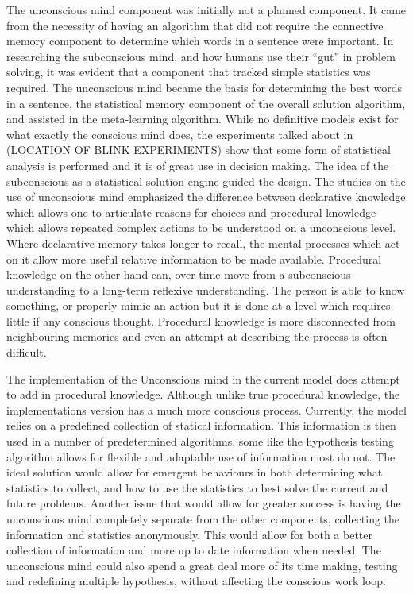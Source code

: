 The unconscious mind component was initially not a planned component.  It came from the necessity of having an algorithm that did not require
the connective memory component to determine which words in a sentence were important. In researching the subconscious mind, and how humans use their ``gut'' in problem solving, it was evident that a component that tracked simple statistics was required. The unconscious mind became the basis for determining the best words in a sentence, the statistical memory component of the overall solution algorithm, and assisted in the meta-learning algorithm.  While no definitive models exist for what exactly the  conscious mind does, the experiments talked about in (LOCATION OF BLINK EXPERIMENTS) show that some form of statistical analysis is performed and it is of great use in decision making.  The idea of the subconscious as a statistical solution engine guided the design.  The studies on the use of unconscious mind emphasized the difference between declarative knowledge which allows one to articulate reasons for choices and procedural knowledge which allows repeated complex actions to be understood on a unconscious level.  Where declarative memory takes longer to recall, the mental processes which act on it allow more useful relative information to be made available.  Procedural knowledge on the other hand can, over time move from a subconscious understanding to a long-term reflexive understanding.  The person is able to know something, or properly mimic an action but it is done at a level which requires little if any conscious thought.  Procedural knowledge is more disconnected from neighbouring memories and even an attempt at describing the process is often difficult. 

The implementation of the Unconscious mind in the current model does attempt to add in procedural knowledge.  Although unlike true procedural knowledge, the implementations version has a much more conscious process.  Currently, the model relies on a predefined collection of statical information.  This information is then used in a number of predetermined algorithms, some like the hypothesis testing algorithm allows for flexible and adaptable use of information most do not.  The ideal solution would allow for emergent behaviours in both determining what statistics to collect, and how to use the statistics to best solve the current and future problems.  Another issue that would allow for greater success is having the unconscious mind completely separate from the other components, collecting the information and statistics anonymously. This would allow for both a better collection of information and more up to date information when needed.  The unconscious mind could also spend a great deal more of its time making, testing and redefining multiple hypothesis, without affecting the conscious work loop. 

